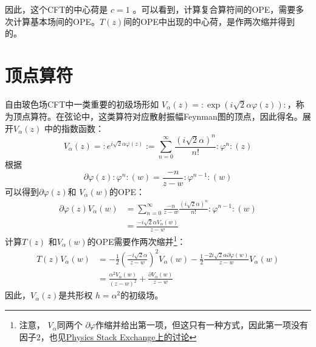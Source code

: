 因此，这个CFT的中心荷是 $c=1$ 。可以看到，计算复合算符间的OPE，需要多次计算基本场间的OPE。$ T(z) $间的OPE中出现的中心荷，是作两次缩并得到的。

\section{顶点算符}
自由玻色场CFT中一类重要的初级场形如 $V_{\alpha}(z)=: \exp (i \sqrt{2} \alpha \varphi(z)): $，称为顶点算符。在弦论中，这类算符对应散射振幅Feynman图的顶点，因此得名。展开$ V_\alpha(z)$ 中的指数函数：
\begin{equation}
	V_{\alpha}(z)=: e^{i \sqrt{2} \alpha \varphi(z)}:=\sum_{n=0}^{\infty} \frac{(i \sqrt{2} \alpha)^{n}}{n !}: \varphi^{n}:(z)
\end{equation}
根据
\begin{equation}
	\partial \varphi(z): \varphi^{n}:(w)=\frac{-n}{z-w}: \varphi^{n-1}:(w)
\end{equation}
可以得到$ \partial \varphi(z) $和 $V_\alpha(w) $的OPE：
\begin{equation}
\begin{aligned} \partial \varphi(z) V_{\alpha}(w) &=\sum_{n=0}^{\infty} \frac{-n}{z-w} \frac{(i \sqrt{2} \alpha)^{n}}{n !}: \varphi^{n-1}:(w) \\ &=\frac{-i \sqrt{2} \alpha V_{\alpha}(w)}{z-w} \end{aligned}
\end{equation}
计算$T(z)$ 和$ V_\alpha(w) $的OPE需要作两次缩并\footnote{注意， $V_\alpha $同两个 $\partial \varphi $作缩并给出第一项，但这只有一种方式，因此第一项没有因子$2$，也见\href{https://physics.stackexchange.com/questions/398365/ope-double-contractions-between-t-and-eikx}{Physics Stack Exchange上的讨论}}：
\begin{equation}
	\begin{aligned} T(z) V_{\alpha}(w) &=-\frac{1}{2}\left(\frac{-i \sqrt{2} \alpha}{z-w}\right)^2 V_{\alpha}(w)-\frac{1}{2} \frac{-2 i \sqrt{2} \alpha \partial \varphi(w)}{z-w} V_{\alpha}(w) \\ &=\frac{\alpha^{2} V_{\alpha}(w)}{(z-w)^{2}}+\frac{\partial V_{\alpha}(w)}{z-w} \end{aligned}
\end{equation}
因此，$V_\alpha(z) $是共形权 $h=\alpha^2 $的初级场。

